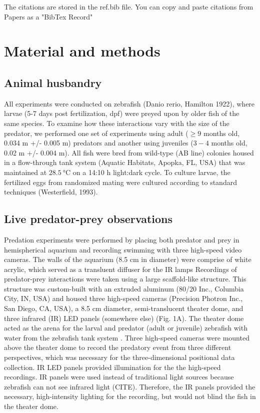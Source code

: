 \documentclass[]{rsos}%
\begin{document}
The citations are stored in the ref.bib file.  You can copy and paste citations from Papers as a "BibTex Record"

\section{Material and methods}

\subsection{Animal husbandry}
All experiments were conducted on zebrafish (Danio rerio, Hamilton 1922), where larvae (5-7 days post fertilization, dpf) were preyed upon by older fish of the same species. 
To examine how these interactions vary with the size of the predator, we performed one set of experiments using adult ($\geq 9$ months old, 0.034 m +/- 0.005 m) predators and another using juveniles  ($3-4$ months old, 0.02 m +/-  0.004 m). 
%
%
%
All fish were bred from wild-type (AB line) colonies housed in a flow-through tank system (Aquatic Habitats, Apopka, FL, USA) that was maintained at $\SI{28.5}{\celsius}$ on a 14:10 h light:dark cycle. 
To culture larvae, the fertilized eggs from randomized mating were cultured according to standard techniques (Westerfield, 1993).

\subsection{Live predator-prey observations}
Predation experiments were performed by placing both predator and prey in hemispherical aquarium and recording swimming with three high-speed video cameras. The walls of the aquarium (8.5 cm in diameter) were comprise of white acrylic, which served as a transluent diffuser for the IR lamps Recordings of predator-prey interactions were taken using a large scaffold-like structure. This structure was custom-built with an extruded aluminum (80/20 Inc., Columbia City, IN, USA) and housed three high-speed cameras (Precision Photron Inc., San Diego, CA, USA), a 8.5 cm diameter, semi-translucent theater dome, and three infrared (IR) LED panels (somewhere else) (Fig. 1A). %
%
The theater dome acted as the arena for the larval and predator (adult or juvenile) zebrafish with water from the zebrafish tank system . 
Three high-speed cameras were mounted above the theater dome to record the predatory event from three different perspectives, which was necessary for the three-dimensional positional data collection. IR LED panels provided illumination for the the high-speed recordings. 
IR panels were used instead of traditional light sources because zebrafish can not see infrared light (CITE). Therefore, the IR panels provided the necessary, high-intensity lighting for the recording, but would not blind the fish in the theater dome.
%
%
%
\end{document}
